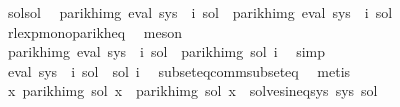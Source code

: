 \begin{isabellebody}
\ sol{\isacharprime}{\kern0pt}{\isacharunderscore}{\kern0pt}sol\ \isamarkupfalse%
\ {\isachardoublequoteopen}parikh{\isacharunderscore}{\kern0pt}img\ {\isacharparenleft}{\kern0pt}eval\ {\isacharparenleft}{\kern0pt}sys\ {\isacharbang}{\kern0pt}\ i{\isacharparenright}{\kern0pt}\ {\isacharquery}{\kern0pt}sol{\isacharprime}{\kern0pt}{\isacharparenright}{\kern0pt}\ {\isacharequal}{\kern0pt}\ parikh{\isacharunderscore}{\kern0pt}img\ {\isacharparenleft}{\kern0pt}eval\ {\isacharparenleft}{\kern0pt}sys\ {\isacharbang}{\kern0pt}\ i{\isacharparenright}{\kern0pt}\ sol{\isacharparenright}{\kern0pt}{\isachardoublequoteclose}\isanewline
\ \ \ \ \ \ \isamarkupfalse%
\ rlexp{\isacharunderscore}{\kern0pt}mono{\isacharunderscore}{\kern0pt}parikh{\isacharunderscore}{\kern0pt}eq\ \isamarkupfalse%
\ meson\isanewline
\ \ \ \ \isamarkupfalse%
\ \isamarkupfalse%
\ {\isachardoublequoteopen}parikh{\isacharunderscore}{\kern0pt}img\ {\isacharparenleft}{\kern0pt}eval\ {\isacharparenleft}{\kern0pt}sys\ {\isacharbang}{\kern0pt}\ i{\isacharparenright}{\kern0pt}\ {\isacharquery}{\kern0pt}sol{\isacharprime}{\kern0pt}{\isacharparenright}{\kern0pt}\ {\isasymsubseteq}\ parikh{\isacharunderscore}{\kern0pt}img\ {\isacharparenleft}{\kern0pt}sol\ i{\isacharparenright}{\kern0pt}{\isachardoublequoteclose}\ \isamarkupfalse%
\ simp\isanewline
\ \ \ \ \isamarkupfalse%
\ \isamarkupfalse%
\ {\isachardoublequoteopen}eval\ {\isacharparenleft}{\kern0pt}sys\ {\isacharbang}{\kern0pt}\ i{\isacharparenright}{\kern0pt}\ {\isacharquery}{\kern0pt}sol{\isacharprime}{\kern0pt}\ {\isasymsubseteq}\ {\isacharquery}{\kern0pt}sol{\isacharprime}{\kern0pt}\ i{\isachardoublequoteclose}\ \isamarkupfalse%
\ subseteq{\isacharunderscore}{\kern0pt}comm{\isacharunderscore}{\kern0pt}subseteq\ \isamarkupfalse%
\ metis\isanewline
\ \ \isamarkupfalse%
\isanewline
\isanewline
\ \ \isamarkupfalse%
\ \isamarkupfalse%
\ {\isachardoublequoteopen}{\isacharparenleft}{\kern0pt}{\isasymforall}x{\isachardot}{\kern0pt}\ parikh{\isacharunderscore}{\kern0pt}img\ {\isacharparenleft}{\kern0pt}sol\ x{\isacharparenright}{\kern0pt}\ {\isacharequal}{\kern0pt}\ parikh{\isacharunderscore}{\kern0pt}img\ {\isacharparenleft}{\kern0pt}{\isacharquery}{\kern0pt}sol{\isacharprime}{\kern0pt}\ x{\isacharparenright}{\kern0pt}{\isacharparenright}{\kern0pt}\ {\isasymand}\ solves{\isacharunderscore}{\kern0pt}ineq{\isacharunderscore}{\kern0pt}sys\ sys\ {\isacharquery}{\kern0pt}sol{\isacharprime}{\kern0pt}{\isachardoublequoteclose}\isanewline

\end{isabellebody}
